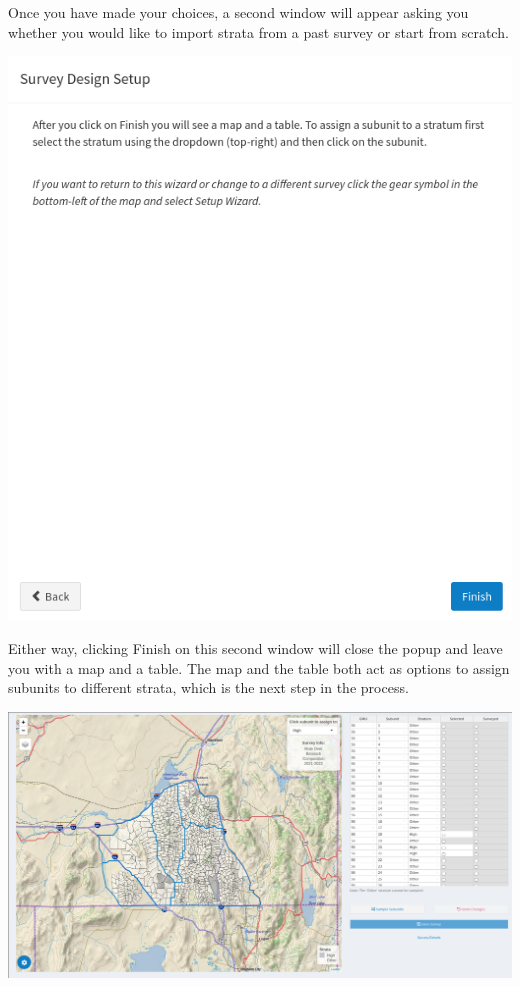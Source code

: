 \documentclass[
]{book}
\begin{document}
Once you have made your choices, a second window will appear asking you whether you would like to import strata from a past survey or start from scratch.

\includegraphics{./www/de_walk4.png}

Either way, clicking {Finish} on this second window will close the popup and leave you with a map and a table. The map and the table both act as options to assign subunits to different strata, which is the next step in the process.

\includegraphics{./www/de_walk5.png}
\end{document}
